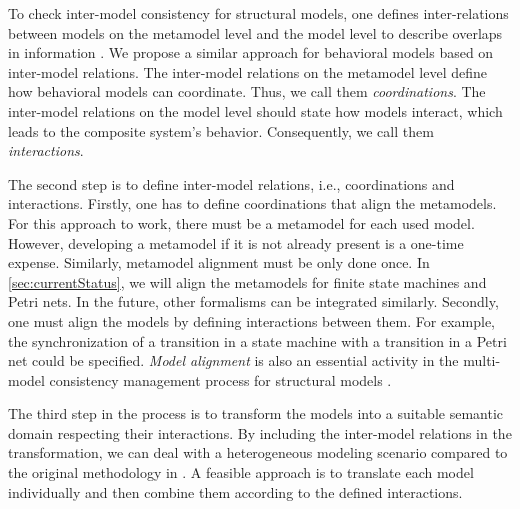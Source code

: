 \documentclass[conference]{IEEEtran}
\begin{document}
To check inter-model consistency for structural models, one defines inter-relations between models on the metamodel level and the model level to describe overlaps in information \cite{stunkelMultipleModelSynchronization2020, elhamlaouiAlignmentViewpointHeterogeneous2016}.
We propose a similar approach for behavioral models based on inter-model relations.
The inter-model relations on the metamodel level define how behavioral models can coordinate.
Thus, we call them \textit{coordinations}.
The inter-model relations on the model level should state how models interact, which leads to the composite system's behavior.
Consequently, we call them \textit{interactions}.

The second step is to define inter-model relations, i.e., coordinations and interactions.
Firstly, one has to define coordinations that align the metamodels.
For this approach to work, there must be a metamodel for each used model.
However, developing a metamodel if it is not already present is a one-time expense.
Similarly, metamodel alignment must be only done once.
In \autoref{sec:currentStatus}, we will align the metamodels for finite state machines and Petri nets.
In the future, other formalisms can be integrated similarly.
Secondly, one must align the models by defining interactions between them.
For example, the synchronization of a transition in a state machine with a transition in a Petri net could be specified.
\textit{Model alignment} is also an essential activity in the multi-model consistency management process for structural models \cite{stunkelMultipleModelSynchronization2020}.

The third step in the process is to transform the models into a suitable semantic domain respecting their interactions.
By including the inter-model relations in the transformation, we can deal with a heterogeneous modeling scenario compared to the original methodology in \cite{engelsMethodologySpecifyingAnalyzing2001}.
A feasible approach is to translate each model individually and then combine them according to the defined interactions.
\end{document}
